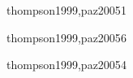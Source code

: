 \begin{syllabus}
\begin{unit}{\PLSEVENDef}{thompson1999,paz2005}{1}

   \begin{topics}
      \item \PLSEVENTopicPanorama
      \item \PLSEVENTopicRecursion
      \item \PLSEVENTopicPragmaticas
      \item \PLSEVENTopicCerraduras
   \end{topics}

   \begin{unitgoals}
      \item \PLSEVENObjONE
      \item \PLSEVENObjTWO
   \end{unitgoals}

\end{unit}

\begin{unit}{\PFFOURDef}{thompson1999,paz2005}{6}
   \begin{topics}
      \item \PFFOURTopicEl
      \item \PFFOURTopicFunciones
      \item \PFFOURTopicProcedimientos
      \item \PFFOURTopicEstrategias
      \item \PFFOURTopicBacktracking
      \item \PFFOURTopicImplementacion
   \end{topics}

   \begin{unitgoals}
      \item \PFFOURObjONE
      \item \PFFOURObjTWO
      \item \PFFOURObjTHREE
      \item \PFFOURObjFOUR
      \item \PFFOURObjFIVE
      \item \PFFOURObjSIX
      \item \PFFOURObjSEVEN
   \end{unitgoals}
\end{unit}

\begin{unit}{\ALTHREEDef}{thompson1999,paz2005}{4}
   \begin{topics}
      \item \ALTHREETopicAlgoritmos
      \item \ALTHREETopicBusqueda
      \item \ALTHREETopicAlgoritmoscuadraticos
      \item \ALTHREETopicAlgoritmosde
      \item \ALTHREETopicArboles
   \end{topics}


\end{unit}
\end{syllabus}
